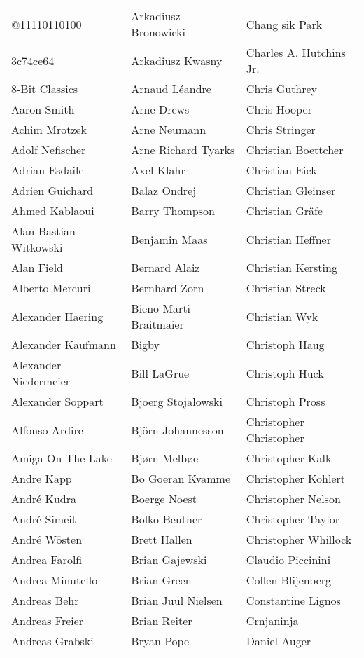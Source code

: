 \newpage
\setlength{\tabcolsep}{1mm}
\begin{tabular}{p{4.5cm}p{4.5cm}p{4.5cm}}
@11110110100 & Arkadiusz Bronowicki & Chang sik Park \\
3c74ce64 & Arkadiusz Kwasny & Charles A. Hutchins Jr. \\
8-Bit Classics & Arnaud Léandre & Chris Guthrey \\
Aaron Smith & Arne Drews & Chris Hooper \\
Achim Mrotzek & Arne Neumann & Chris Stringer \\
Adolf Nefischer & Arne Richard Tyarks & Christian Boettcher \\
Adrian Esdaile & Axel Klahr & Christian Eick \\
Adrien Guichard & Balaz Ondrej & Christian Gleinser \\
Ahmed Kablaoui & Barry Thompson & Christian Gräfe \\
Alan Bastian Witkowski & Benjamin Maas & Christian Heffner \\
Alan Field & Bernard Alaiz & Christian Kersting \\
Alberto Mercuri & Bernhard Zorn & Christian Streck \\
Alexander Haering & Bieno Marti-Braitmaier & Christian Wyk \\
Alexander Kaufmann & Bigby & Christoph Haug \\
Alexander Niedermeier & Bill LaGrue & Christoph Huck \\
Alexander Soppart & Bjoerg Stojalowski & Christoph Pross \\
Alfonso Ardire & Björn Johannesson & Christopher Christopher \\
Amiga On The Lake & Bjørn Melbøe & Christopher Kalk \\
Andre Kapp & Bo Goeran Kvamme & Christopher Kohlert \\
André Kudra & Boerge Noest & Christopher Nelson \\
André Simeit & Bolko Beutner & Christopher Taylor \\
André Wösten & Brett Hallen & Christopher Whillock \\
Andrea Farolfi & Brian Gajewski & Claudio Piccinini \\
Andrea Minutello & Brian Green & Collen Blijenberg \\
Andreas Behr & Brian Juul Nielsen & Constantine Lignos \\
Andreas Freier & Brian Reiter & Crnjaninja \\
Andreas Grabski & Bryan Pope & Daniel Auger \\

\end{tabular}
